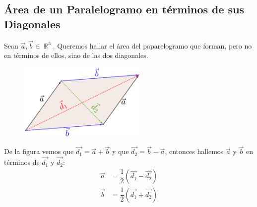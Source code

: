 \documentclass[12pt, fleqn]{report}                             %
\theoremstyle{break}                                            %
\DeclareMathOperator \Reals        {\mathbb{R}}                 %
\newcommand{\Wrap}[1]{\left( #1 \right)}                        %
\begin{document}
            \subsection{Área de un Paralelogramo en términos de sus Diagonales}
            
                Sean $\vec{a}, \vec{b} \in \Reals^3$.
                Queremos hallar el área del paparelogramo que forman, pero no en términos de ellos, sino de las dos diagonales.
                
                \begin{figure}[H]
                    \centering
                    \includegraphics[width=0.55\textwidth]{parallelogram2}
                \end{figure}
                
                De la figura vemos que $\vec{d_1} = \vec{a}+\vec{b}$ y que $\vec{d_2} = \vec{b}-\vec{a}$,
                entonces hallemos $\vec{a}$ y $\vec{b}$ en términos de $\vec{d_1}$ y $\vec{d_2}$:
                \begin{align*}
                    \vec{a} &= \dfrac{1}{2}\Wrap{\vec{d_1} - \vec{d_2}}     \\
                    \vec{b} &= \dfrac{1}{2}\Wrap{\vec{d_1} + \vec{d_2}}
                \end{align*}
                
\end{document}
